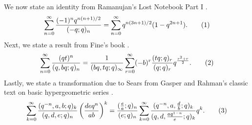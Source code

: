 \documentclass[12pt]{amsart}
\theoremstyle{definition}
\theoremstyle{remark}
\numberwithin{equation}{section}
\newcommand\numberthis{\addtocounter{equation}{1}\tag{\theequation}}
\begin{document}
We now state an identity from Ramanujan's Lost Notebook Part I \cite[p. $233$, $(9.4.3)$]{AndrewsBerndt2005}.
\begin{align*}
\sum\limits_{n=0}^{\infty}\dfrac{(-1)^nq^{n(n+1)/2}}{(-q;q)_n} = \sum\limits_{n=0}^{\infty}q^{n(3n+1)/2}(1-q^{2n+1}).\numberthis\label{eq24}    
\end{align*}
Next, we state a result from Fine's book \cite[p. $24$, $(20.21)$]{Fine88}.
\begin{align*}
\sum\limits_{n=0}^{\infty}\dfrac{(qt)^n}{(q,bq;q)_n} = \dfrac{1}{(bq,tq;q)_{\infty}}\sum\limits_{r=0}^{\infty}(-b)^r\dfrac{(tq;q)_r}{(q;q)_r}q^{\frac{r^2+r}{2}}.\numberthis\label{eq25}   
\end{align*}
Lastly, we state a transformation due to Sears from Gasper and Rahman's classic text on basic hypergeometric series \cite[p. $71$, $(3.2.5)$]{GasperRahman2004}.
\begin{align*}
\sum\limits_{k=0}^{\infty}\dfrac{(q^{-n},a,b;q)_k}{(q,d,e;q)_n}\left(\frac{deq^n}{ab}\right)^k = \dfrac{(\frac{e}{a};q)_n}{(e;q)_n}\sum\limits_{k=0}^{\infty}\dfrac{(q^{-n},a,\frac{d}{b};q)_k}{(q,d,\frac{aq^{1-n}}{e};q)_k}q^k.\numberthis\label{eq26}\\
\end{align*}
\end{document}
